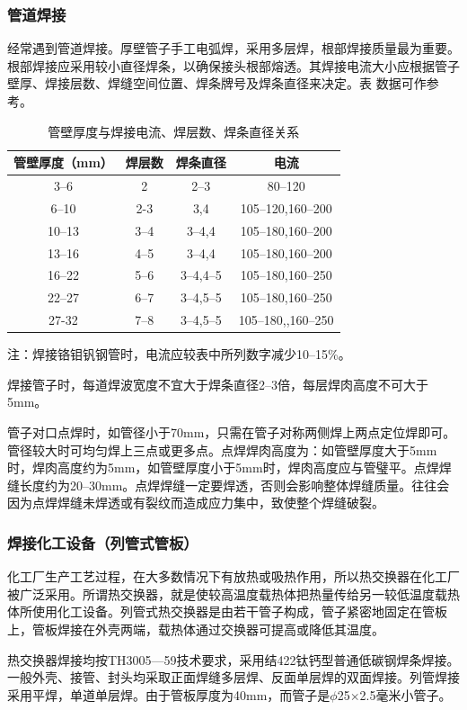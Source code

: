 \documentclass{ctexbook}
\begin{document}
\subsubsection{管道焊接}
经常遇到管道焊接。厚壁管子手工电弧焊，采用多层焊，根部焊接质量最为重要。根部焊接应采用较小直径焊条，以确保接头根部熔透。其焊接电流大小应根据管子壁厚、焊接层数、焊缝空间位置、焊条牌号及焊条直径来决定。表 数据可作参考。
\begin{table}[htbp]
	\centering
	\caption{管壁厚度与焊接电流、焊层数、焊条直径关系}
	\begin{tabular}{c|c|c|c}
		\hline
		管壁厚度（mm）&焊层数&焊条直径&电流\\ \hline
		3--6&2&2--3&80--120\\ \hline
		6--10&2-3&3,4&105--120,160--200\\ \hline
		10--13&3--4&3--4,4&105--180,160--200\\ \hline
		13--16&4--5&3--4,4&105--180,160--200\\ \hline
		16--22&5--6&3--4,4--5&105--180,160--250\\ \hline
		22--27&6--7&3--4,5--5&105--180,160--250\\ \hline
		27-32&7--8&3--4,5--5&105--180,,160--250\\ \hline
	\end{tabular}%
	\label{tab:guanbihoudu}%
\end{table}%
注：焊接铬钼钒钢管时，电流应较表中所列数字减少10--15\%。

焊接管子时，每道焊波宽度不宜大于焊条直径2--3倍，每层焊肉高度不可大于5mm。

管子对口点焊时，如管径小于70mm，只需在管子对称两侧焊上两点定位焊即可。管径较大时可均匀焊上三点或更多点。点焊焊肉高度为：如管壁厚度大于5mm时，焊肉高度约为5mm，如管壁厚度小于5mm时，焊肉高度应与管璧平。点焊焊缝长度约为20--30mm。点焊焊缝一定要焊透，否则会影响整体焊缝质量。往往会因为点焊焊缝未焊透或有裂纹而造成应力集中，致使整个焊缝破裂。
\subsubsection{焊接化工设备（列管式管板）}
化工厂生产工艺过程，在大多数情况下有放热或吸热作用，所以热交换器在化工厂被广泛采用。所谓热交换器，就是使较高温度载热体把热量传给另一较低温度载热体所使用化工设备。列管式热交换器是由若干管子构成，管子紧密地固定在管板上，管板焊接在外壳两端，载热体通过交换器可提高或降低其温度。

热交换器焊接均按TH3005—59技术要求，采用结422钛钙型普通低碳钢焊条焊接。一般外壳、接管、封头均采取正面焊缝多层焊、反面单层焊的双面焊接。列管焊接采用平焊，单道单层焊。由于管板厚度为40mm，而管子是$\phi$25$\times$2.5毫米小管子。
\end{document}
